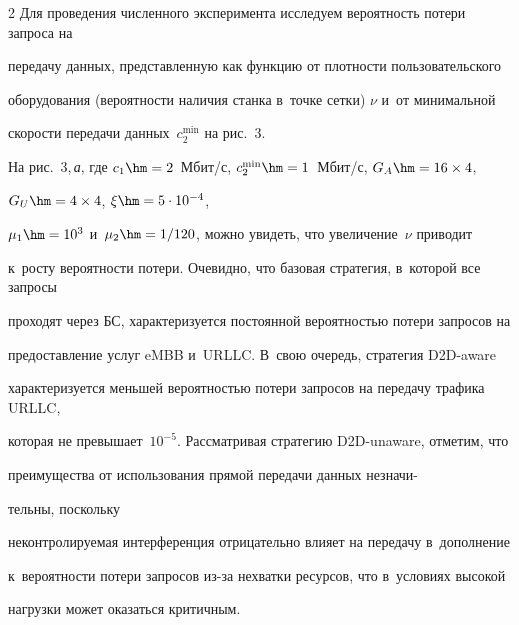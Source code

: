 \begin{multicols}{2}
Для проведения численного эксперимента исследуем ве\-ро\-ят\-ность потери запроса на 


передачу данных, представленную как функцию от плот\-ности пользовательского 


оборудования (ве\-ро\-ят\-ности наличия стан\-ка в~точ\-ке сетки) $\nu$ и~от минимальной 


ско\-рости передачи данных~$c_{2}^{\min}$ на рис.~3.





На рис.~3,\,\textit{а}, где $c_1\hm = 2$~Мбит/с, $c_{2}^{\min} \hm= 1$~Мбит/с, $G_A\hm = 16\times 4$, 


$G_U \hm= 4\times4$, $\xi\hm = 5\cdot 10^{-4}$, 


$\mu_1 \hm= 10^3$ и~$\mu_2 \hm= 1/120$, мож\-но увидеть, что увеличение~$\nu$ приводит 


к~росту вероятности потери. Очевидно, что базовая стратегия, в~которой все запросы 


проходят через БС, характеризуется по\-сто\-ян\-ной ве\-ро\-ят\-ностью потери запросов на 


предостав\-ле\-ние услуг eMBB и~URLLC. В~свою очередь, стратегия D2D-aware 


характеризуется меньшей ве\-ро\-ят\-ностью потери запросов на передачу трафика URLLC, 


которая не превышает~$10^{-5}$. Рас\-смат\-ри\-вая стратегию D2D-unaware, отметим, что 


преимущества от использования прямой передачи данных незначи-\linebreak\vspace*{-12pt}





\pagebreak





\noindent


тельны, поскольку 


не\-конт\-ро\-ли\-ру\-емая интерференция отрицательно влияет на передачу в~дополнение 


к~ве\-ро\-ят\-ности потери запросов из-за нехватки ресурсов, что в~условиях высокой 


на\-груз\-ки может оказаться критичным.












\end{multicols}
